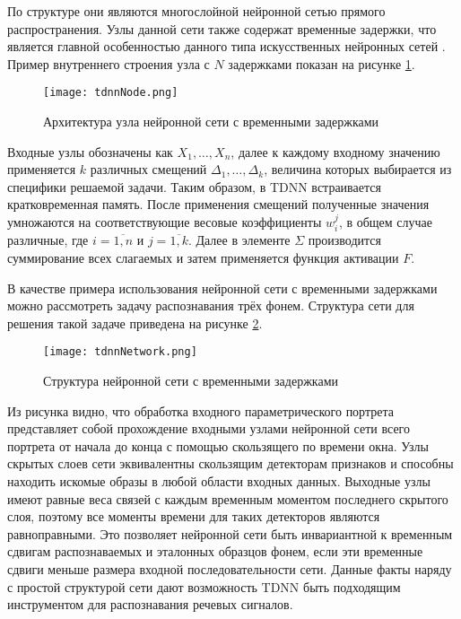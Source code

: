 По структуре они являются многослойной нейронной сетью прямого распространения.
Узлы данной сети также содержат временные задержки, что является главной особенностью данного типа искусственных нейронных сетей \cite{waibel1995phoneme}.
Пример внутреннего строения узла с $N$ задержками показан на рисунке \ref{fig:tdnnNode}.

\begin{figure}[h]
	\centering
	\texttt{[image: tdnnNode.png]}
	\caption{Архитектура узла нейронной сети с временными задержками}
	\label{fig:tdnnNode}
\end{figure}

Входные узлы обозначены как $X_1, \dots, X_n$, далее к каждому входному значению применяется $k$ различных смещений $\Delta_1, \dots, \Delta_k$, величина которых выбирается из специфики решаемой задачи.
Таким образом, в TDNN встраивается кратковременная память.
После применения смещений полученные значения умножаются на соответствующие весовые коэффициенты $w_i^j$, в общем случае различные, где $i = \overline{1, n}$ и $j = \overline{1, k}$.
Далее в элементе $\Sigma$ производится суммирование всех слагаемых и затем применяется функция активации $F$.

В качестве примера использования нейронной сети с временными задержками можно рассмотреть задачу распознавания трёх фонем.
Структура сети для решения такой задаче приведена на рисунке \ref{fig:tdnnNetwork}.

\begin{figure}[h]
	\centering
	\texttt{[image: tdnnNetwork.png]}
	\caption{Структура нейронной сети с временными задержками}
	\label{fig:tdnnNetwork}
\end{figure}

Из рисунка видно, что обработка входного параметрического портрета представляет собой прохождение входными узлами нейронной сети всего портрета от начала до конца с помощью скользящего по времени окна.
Узлы скрытых слоев сети эквивалентны скользящим детекторам признаков и способны находить искомые образы в любой области входных данных.
Выходные узлы имеют равные веса связей с каждым временным моментом последнего скрытого слоя, поэтому все моменты времени для таких детекторов являются равноправными.
Это позволяет нейронной сети быть инвариантной к временным сдвигам распознаваемых и эталонных образцов фонем, если эти временные сдвиги меньше размера входной последовательности сети.
Данные факты наряду с простой структурой сети дают возможность TDNN быть подходящим инструментом для распознавания речевых сигналов.

